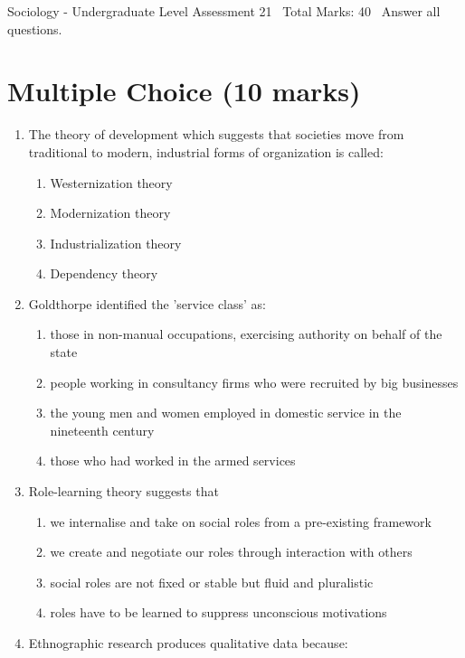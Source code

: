 \documentclass[12pt]{article}
\begin{document}
\begin{center}
Sociology - Undergraduate Level Assessment 21 \
Total Marks: 40 \
Answer all questions.
\end{center}

\section*{Multiple Choice (10 marks)}
\begin{enumerate}[label=\arabic*.]
\item The theory of development which suggests that societies move from traditional to modern, industrial forms of organization is called:
\begin{enumerate}[label=(\alph*)]
    \item Westernization theory
    \item Modernization theory
    \item Industrialization theory
    \item Dependency theory
\end{enumerate}
\item Goldthorpe identified the 'service class' as:
\begin{enumerate}[label=(\alph*)]
    \item those in non-manual occupations, exercising authority on behalf of the state
    \item people working in consultancy firms who were recruited by big businesses
    \item the young men and women employed in domestic service in the nineteenth century
    \item those who had worked in the armed services
\end{enumerate}
\item Role-learning theory suggests that
\begin{enumerate}[label=(\alph*)]
    \item we internalise and take on social roles from a pre-existing framework
    \item we create and negotiate our roles through interaction with others
    \item social roles are not fixed or stable but fluid and pluralistic
    \item roles have to be learned to suppress unconscious motivations
\end{enumerate}
\item Ethnographic research produces qualitative data because:
\begin{enumerate}[label=(\alph*)]

\end{enumerate}
\end{enumerate}
\end{document}
